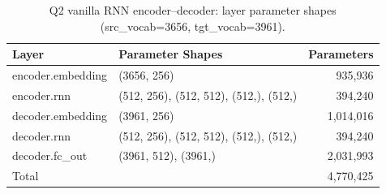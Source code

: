 \begin{table}[htbp]
\centering
\scriptsize
\caption{Q2 vanilla RNN encoder--decoder: layer parameter shapes (src\_vocab=3656, tgt\_vocab=3961).}
\label{tab:q2seq2seqlayers}
\begin{tabular}{lp{3.4cm}r}
\hline
Layer & Parameter Shapes & Parameters \\
\hline
encoder.embedding & (3656, 256) & 935,936 \\
encoder.rnn & (512, 256), (512, 512), (512,), (512,) & 394,240 \\
decoder.embedding & (3961, 256) & 1,014,016 \\
decoder.rnn & (512, 256), (512, 512), (512,), (512,) & 394,240 \\
decoder.fc\_out & (3961, 512), (3961,) & 2,031,993 \\
\hline
Total & & 4,770,425 \\
\hline
\end{tabular}
\end{table}
